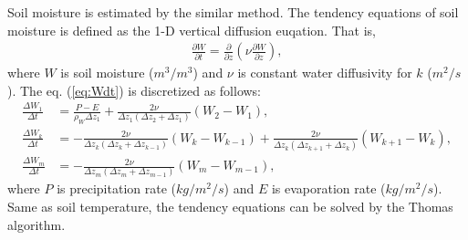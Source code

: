 Soil moisture is estimated by the similar method.
The tendency equations of soil moisture is defined as the 1-D vertical diffusion euqation.
That is,
\begin{align}
  \frac{\partial W}{\partial t} = \frac{\partial}{\partial z} \left( \nu \frac{\partial W}{\partial z} \right),
  \label{eq:Wdt}
\end{align}
where $W$ is soil moisture ($m^3/m^3$) and $\nu$ is constant water diffusivity for $k$ ($m^2/s$).
The eq. (\ref{eq:Wdt}) is discretized as follows:
\begin{align}
  \frac{\Delta W_{1}}{\Delta t} &= \frac{P - E}{\rho_{W}\Delta z_{1}} + \frac{2\nu}{\Delta z_{1}(\Delta z_{2}+\Delta z_{1})} (W_{2}-W_{1}), \\
  \frac{\Delta W_{k}}{\Delta t} &= - \frac{2\nu}{\Delta z_{k}(\Delta z_{k}+\Delta z_{k-1})} (W_{k}-W_{k-1}) + \frac{2\nu}{\Delta z_{k}(\Delta z_{k+1}+\Delta z_{k})} (W_{k+1}-W_{k}), \\
  \frac{\Delta W_{m}}{\Delta t} &= - \frac{2\nu}{\Delta z_{m}(\Delta z_{m}+\Delta z_{m-1})} (W_{m}-W_{m-1}),
\end{align}
where $P$ is precipitation rate ($kg/m^2/s$) and $E$ is evaporation rate ($kg/m^2/s$).
Same as soil temperature, the tendency equations can be solved by the Thomas algorithm.
